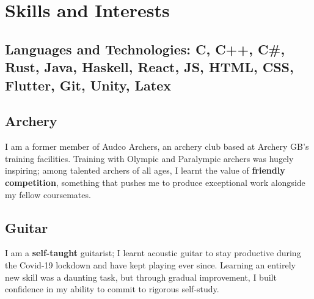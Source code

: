 \documentclass{article}
\newcommand{\indentedblock}[1]{
    \hfill
    \begin{minipage}{\dimexpr\textwidth - 1.95em}
        #1
    \end{minipage}
}
\begin{document}
\section*{Skills and Interests}

\subsection*{\textbf{Languages and Technologies}: C, C++, C\#, Rust, Java, Haskell, React, JS, HTML, CSS, Flutter, Git, Unity, Latex}
\vspace{0.5em}

\subsection*{\textbf{Archery}}
\vspace{-0.5em}
\indentedblock{
    I am a former member of Audco Archers, an archery club based at Archery GB's training facilities.
    Training with Olympic and Paralympic archers was hugely inspiring; among talented archers of all ages, 
    I learnt the value of \textbf{friendly competition}, something that pushes me to produce exceptional work alongside 
    my fellow coursemates.
}

\subsection*{\textbf{Guitar}}
\vspace{-0.5em}
\indentedblock{
    I am a \textbf{self-taught} guitarist; I learnt acoustic guitar to stay productive during the Covid-19 lockdown and have kept playing ever since. 
    Learning an entirely new skill was a daunting task, but through gradual improvement, I built confidence in my ability to commit 
    to rigorous self-study.
}
\end{document}
